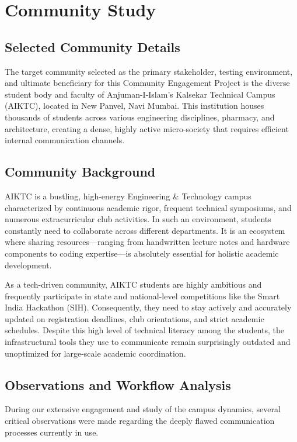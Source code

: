 \chapter{Community Study}

\section{Selected Community Details}
The target community selected as the primary stakeholder, testing environment, and ultimate beneficiary for this Community Engagement Project is the diverse student body and faculty of Anjuman-I-Islam's Kalsekar Technical Campus (AIKTC), located in New Panvel, Navi Mumbai. This institution houses thousands of students across various engineering disciplines, pharmacy, and architecture, creating a dense, highly active micro-society that requires efficient internal communication channels.

\section{Community Background}
AIKTC is a bustling, high-energy Engineering \& Technology campus characterized by continuous academic rigor, frequent technical symposiums, and numerous extracurricular club activities. In such an environment, students constantly need to collaborate across different departments. It is an ecosystem where sharing resources—ranging from handwritten lecture notes and hardware components to coding expertise—is absolutely essential for holistic academic development. 

As a tech-driven community, AIKTC students are highly ambitious and frequently participate in state and national-level competitions like the Smart India Hackathon (SIH). Consequently, they need to stay actively and accurately updated on registration deadlines, club orientations, and strict academic schedules. Despite this high level of technical literacy among the students, the infrastructural tools they use to communicate remain surprisingly outdated and unoptimized for large-scale academic coordination.

\section{Observations and Workflow Analysis}
During our extensive engagement and study of the campus dynamics, several critical observations were made regarding the deeply flawed communication processes currently in use. 


